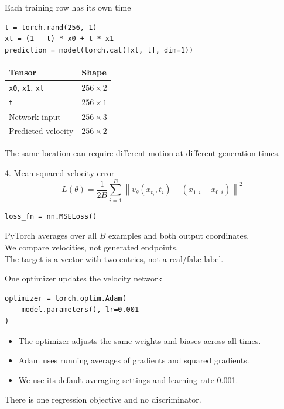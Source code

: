 \documentclass[aspectratio=169,11pt]{beamer}
\begin{document}
\begin{frame}[fragile]{Each training row has its own time}
\begin{lstlisting}
t = torch.rand(256, 1)
xt = (1 - t) * x0 + t * x1
prediction = model(torch.cat([xt, t], dim=1))
\end{lstlisting}
\begin{center}
\begin{tabular}{ll}
\toprule
Tensor & Shape\\\midrule
\texttt{x0}, \texttt{x1}, \texttt{xt} & $256\times2$\\[2mm]
\texttt{t} & $256\times1$\\[2mm]
Network input & $256\times3$\\[2mm]
Predicted velocity & $256\times2$\\\bottomrule
\end{tabular}
\end{center}
\small The same location can require different motion at different generation times.
\end{frame}

\begin{frame}[fragile]{4. Mean squared velocity error}
\large
\[L(\theta)=\frac{1}{2B}\sum_{i=1}^B
\left\|v_\theta(x_{t_i},t_i)-(x_{1,i}-x_{0,i})\right\|^2\]
\normalsize
\begin{lstlisting}
loss_fn = nn.MSELoss()
\end{lstlisting}
\vspace{3mm}
PyTorch averages over all $B$ examples and both output coordinates.\\[3mm]
We compare velocities, not generated endpoints.\\[3mm]
The target is a vector with two entries, not a real/fake label.
\end{frame}

\begin{frame}[fragile]{One optimizer updates the velocity network}
\begin{lstlisting}
optimizer = torch.optim.Adam(
    model.parameters(), lr=0.001
)
\end{lstlisting}
\begin{itemize}\setlength\itemsep{4mm}
\item The optimizer adjusts the same weights and biases across all times.
\item Adam uses running averages of gradients and squared gradients.
\item We use its default averaging settings and learning rate 0.001.
\end{itemize}
\vspace{4mm}
There is one regression objective and no discriminator.
\end{frame}
\end{document}

